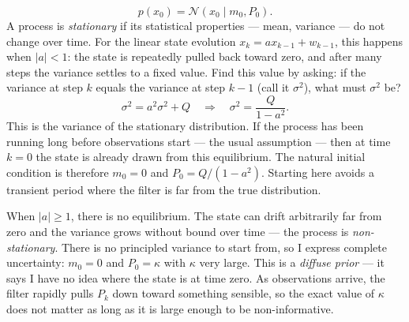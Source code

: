 \documentclass{article}
\newcommand{\Gauss}{\mathcal{N}}  %
\begin{document}
\begin{equation}
  p(x_0) = \Gauss(x_0 \mid m_0, P_0).
\end{equation}
A process is \textit{stationary} if its statistical properties --- mean, variance --- do not change over time. For the linear state evolution $x_k = a x_{k-1} + w_{k-1}$, this happens when $|a| < 1$: the state is repeatedly pulled back toward zero, and after many steps the variance settles to a fixed value. Find this value by asking: if the variance at step $k$ equals the variance at step $k-1$ (call it $\sigma^2$), what must $\sigma^2$ be?
\begin{equation}
    \sigma^2 = a^2 \sigma^2 + Q \quad \Rightarrow \quad \sigma^2 = \frac{Q}{1 - a^2}.
\end{equation}
This is the variance of the stationary distribution. If the process has been running long before observations start --- the usual assumption --- then at time $k=0$ the state is already drawn from this equilibrium. The natural initial condition is therefore $m_0 = 0$ and $P_0 = Q/(1-a^2)$. Starting here avoids a transient period where the filter is far from the true distribution.

When $|a| \geq 1$, there is no equilibrium. The state can drift arbitrarily far from zero and the variance grows without bound over time --- the process is \textit{non-stationary}. There is no principled variance to start from, so I express complete uncertainty: $m_0 = 0$ and $P_0 = \kappa$ with $\kappa$ very large. This is a \textit{diffuse prior} --- it says I have no idea where the state is at time zero. As observations arrive, the filter rapidly pulls $P_k$ down toward something sensible, so the exact value of $\kappa$ does not matter as long as it is large enough to be non-informative.
\end{document}
